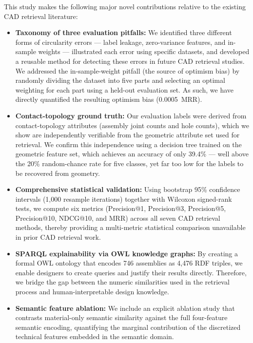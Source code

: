 \documentclass[preprint,12pt]{elsarticle}
\begin{document}
This study makes the following major novel contributions relative to the existing CAD retrieval literature:
\begin{itemize}
    \item \textbf{Taxonomy of three evaluation pitfalls:} We identified three different forms of circularity errors --- label leakage, zero-variance features, and in-sample weights --- illustrated each error using specific datasets, and developed a reusable method for detecting these errors in future CAD retrieval studies. We addressed the in-sample-weight pitfall (the source of optimism bias) by randomly dividing the dataset into five parts and selecting an optimal weighting for each part using a held-out evaluation set. As such, we have directly quantified the resulting optimism bias (0.0005~MRR).
    \item \textbf{Contact-topology ground truth:} Our evaluation labels were derived from contact-topology attributes (assembly joint counts and hole counts), which we show are independently verifiable from the geometric attribute set used for retrieval. We confirm this independence using a decision tree trained on the geometric feature set, which achieves an accuracy of only 39.4\% --- well above the 20\% random-chance rate for five classes, yet far too low for the labels to be recovered from geometry.
    \item \textbf{Comprehensive statistical validation:} Using bootstrap 95\% confidence intervals (1,000 resample iterations) together with Wilcoxon signed-rank tests, we compute six metrics (Precision@1, Precision@3, Precision@5, Precision@10, NDCG@10, and MRR) across all seven CAD retrieval methods, thereby providing a multi-metric statistical comparison unavailable in prior CAD retrieval work.
    \item \textbf{SPARQL explainability via OWL knowledge graphs:} By creating a formal OWL ontology that encodes 746 assemblies as 4,476 RDF triples, we enable designers to create queries and justify their results directly. Therefore, we bridge the gap between the numeric similarities used in the retrieval process and human-interpretable design knowledge.
    \item \textbf{Semantic feature ablation:} We include an explicit ablation study that contrasts material-only semantic similarity against the full four-feature semantic encoding, quantifying the marginal contribution of the discretized technical features embedded in the semantic domain.
\end{itemize}
\end{document}

